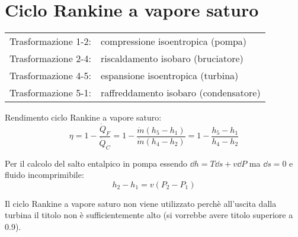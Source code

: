 \section{Ciclo Rankine a vapore saturo}

\begin{tabular}{p{2.5cm}l}
Trasformazione 1-2: & compressione isoentropica (pompa)\\
Trasformazione 2-4: & riscaldamento isobaro (bruciatore)\\
Trasformazione 4-5: & espansione isoentropica (turbina)\\
Trasformazione 5-1: & raffreddamento isobaro (condensatore)\\
\end{tabular}

Rendimento ciclo Rankine a vapore saturo:
\[ \eta = 1 - \frac{\dot{Q}_F}{\dot{Q}_C} = 1 - \frac{\dot{m}(h_5-h_1)}{\dot{m}(h_4-h_2)} = 1 - \frac{h_5-h_1}{h_4-h_2} \]

Per il calcolo del salto entalpico in pompa essendo $\dd{h} = T\dd{s} + v\dd{P}$ ma $\dd{s} = 0$ e fluido incomprimibile:
\[ h_2-h_1 = v(P_2-P_1) \]

Il ciclo Rankine a vapore saturo non viene utilizzato perchè all'uscita dalla turbina il titolo non è sufficientemente alto (si vorrebbe avere titolo superiore a 0.9).
